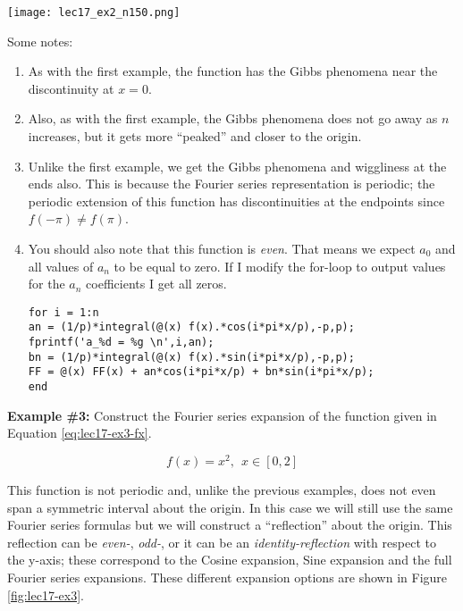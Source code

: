 \begin{marginfigure}
\texttt{[image: lec17\_ex2\_n150.png]}
\caption{Fourier series expansion with \lstinline{n=150}.}
\label{fig:lec17-ex2-n150}
\end{marginfigure}
Some notes:
\begin{enumerate}
\item As with the first example, the function has the Gibbs phenomena near the discontinuity at $x=0$.  
\item Also, as with the first example, the Gibbs phenomena does not go away as $n$ increases, but it gets more ``peaked'' and closer to the origin.
\item Unlike the first example, we get the Gibbs phenomena and wiggliness at the ends also.  This is because the Fourier series representation is periodic; the periodic extension of this function has discontinuities at the endpoints since $f(-\pi) \ne f(\pi)$.  
\item You should also note that this function is \emph{even}.  That means we expect $a_0$ and all values of $a_n$ to be equal to zero. If I modify the for-loop to output values for the $a_n$ coefficients I get all zeros.

\begin{lstlisting}
for i = 1:n
an = (1/p)*integral(@(x) f(x).*cos(i*pi*x/p),-p,p);
fprintf('a_%d = %g \n',i,an);
bn = (1/p)*integral(@(x) f(x).*sin(i*pi*x/p),-p,p);
FF = @(x) FF(x) + an*cos(i*pi*x/p) + bn*sin(i*pi*x/p); 
end
\end{lstlisting}
\end{enumerate}


\vspace{1.0cm}

\noindent\textbf{Example \#3:} Construct the Fourier series expansion of the function given in Equation \ref{eq:lec17-ex3-fx}.

\begin{equation}
f(x) = x^2, \ \ x \in[0,2]
\label{eq:lec17-ex3-fx}
\end{equation}

This function is not periodic and, unlike the previous examples, does not even span a symmetric interval about the origin.  In this case we will still use the same Fourier series formulas but we will construct a ``reflection'' about the origin.  This reflection can be \emph{even-}, \emph{odd-}, or it can be an \emph{identity-reflection} with respect to the y-axis; these correspond to the Cosine expansion, Sine expansion and the full Fourier series expansions.  These different expansion options are shown in Figure \ref{fig:lec17-ex3}.

